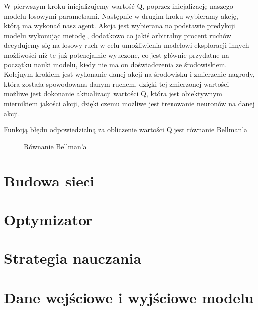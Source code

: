 W pierwszym kroku inicjalizujemy wartość Q, poprzez inicjalizację naszego modelu losowymi parametrami. Następnie w drugim kroku wybieramy akcję, którą ma wykonać nasz agent. Akcja jest wybierana na podstawie predykcji modelu wykonując metodę , dodatkowo co jakiś arbitralny procent ruchów decydujemy się na losowy ruch w celu umożliwienia modelowi eksploracji innych możliwości niż te już potencjalnie wyuczone, co jest głównie przydatne na początku nauki modelu, kiedy nie ma on doświadczenia ze środowiskiem. Kolejnym krokiem jest wykonanie danej akcji na środowisku i zmierzenie nagrody, która została spowodowana danym ruchem, dzięki tej zmierzonej wartości możliwe jest dokonanie aktualizacji wartości Q, która jest obiektywnym miernikiem jakości akcji, dzięki czemu możliwe jest trenowanie neuronów na danej akcji.

Funkcją błędu odpowiedzialną za obliczenie wartości Q jest równanie Bellman'a \cite{BellmanEquation}


\begin{figure}[h]
    \centering
    \caption{Równanie Bellman'a \cite{BellmanEquationPic}}
    \label{img:bellman_eq}
\end{figure}




\section{Budowa sieci}




\section{Optymizator}



\section{Strategia nauczania}



\section{Dane wejściowe i wyjściowe modelu}



